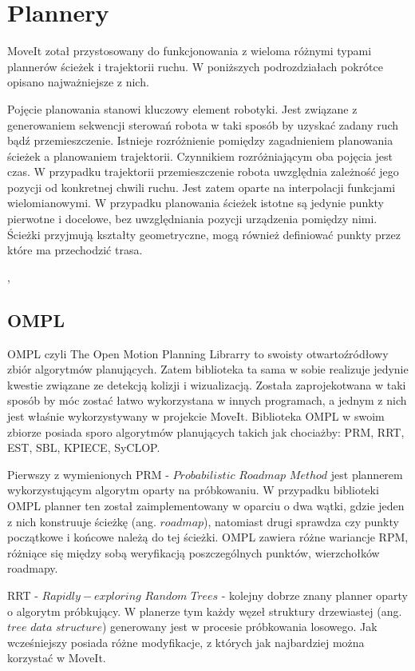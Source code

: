 \section{Plannery}
\label{sec:kompilacja}

MoveIt zotał przystosowany do funkcjonowania z wieloma różnymi typami plannerów ścieżek i trajektorii ruchu. W poniższych podrozdziałach pokrótce opisano najważniejsze z nich. 

Pojęcie planowania stanowi kluczowy element robotyki. Jest związane z generowaniem sekwencji sterowań robota w taki sposób by uzyskać zadany ruch bądź przemieszczenie. Istnieje rozróżnienie pomiędzy zagadnieniem planowania ścieżek a planowaniem trajektorii. Czynnikiem rozróżniającym oba pojęcia jest czas. W przypadku trajektorii przemieszczenie robota uwzględnia zależność jego pozycji od konkretnej chwili ruchu. Jest zatem oparte na interpolacji funkcjami wielomianowymi. W przypadku planowania ścieżek istotne są jedynie punkty pierwotne i docelowe, bez uwzględniania pozycji urządzenia pomiędzy nimi. Ścieżki przyjmują kształty geometryczne, mogą również definiować punkty przez które ma przechodzić trasa.

\cite{Gasparetto2015}, \cite{Gasparetto2012}
\cite{MathWorks_planner}

\subsection{OMPL}

OMPL czyli The Open Motion Planning Librarry to swoisty otwartoźródłowy zbiór algorytmów planujących. Zatem biblioteka ta sama w sobie realizuje jedynie kwestie związane ze detekcją kolizji i wizualizacją. Została zaprojekotwana w taki sposób by móc zostać łatwo wykorzystana w innych programach, a jednym z nich jest właśnie wykorzystywany w projekcie MoveIt. Biblioteka OMPL w swoim zbiorze posiada sporo algorytmów planujących takich jak chociażby: PRM, RRT, EST, SBL, KPIECE, SyCLOP. \cite{OMPL}

Pierwszy z wymienionych PRM - $Probabilistic$ $Roadmap$ $Method$ jest plannerem wykorzystującym algorytm oparty na próbkowaniu. W przypadku biblioteki OMPL planner ten został zaimplementowany w oparciu o dwa wątki, gdzie jeden z nich konstruuje ścieżkę (ang. $roadmap$), natomiast drugi sprawdza czy punkty początkowe i końcowe należą do tej ścieżki. OMPL zawiera różne wariancje RPM, różniące się między sobą weryfikacją poszczególnych punktów, wierzchołków roadmapy.

RRT - $Rapidly-exploring$ $Random$ $Trees$ - kolejny dobrze znany planner oparty o algorytm próbkujący. W planerze tym każdy węzeł struktury drzewiastej (ang. $tree$ $ data$ $ structure$) generowany jest w procesie próbkowania losowego. Jak wcześniejszy posiada różne modyfikacje, z których jak najbardziej można korzystać w MoveIt. \cite{8675925}

